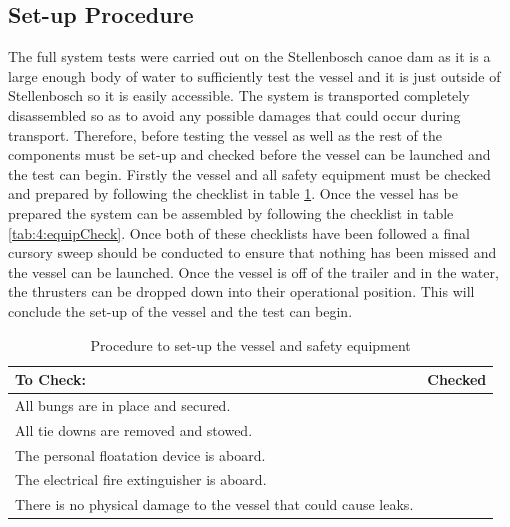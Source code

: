 \subsection{Set-up Procedure} 
The full system tests were carried out on the Stellenbosch canoe dam as it is a large enough body of water to sufficiently test the vessel and it is just outside of Stellenbosch so it is easily accessible. The system is transported completely disassembled so as to avoid any possible damages that could occur during transport. Therefore, before testing the vessel as well as the rest of the components must be set-up and checked before the vessel can be launched and the test can begin. Firstly the vessel and all safety equipment must be checked and prepared by following the checklist in table \ref{tab:4:boatCheck}. Once the vessel has be prepared the system can be assembled by following the checklist in table \ref{tab:4:equipCheck}. Once both of these checklists have been followed a final cursory sweep should be conducted to ensure that nothing has been missed and the vessel can be launched. Once the vessel is off of the trailer and in the water, the thrusters can be dropped down into their operational position. This will conclude the set-up of the vessel and the test can begin. 
\begin{table}
	\begin{center}
		
		\caption{Procedure to set-up the vessel and safety equipment}
		\label{tab:4:boatCheck}
		\begin{tabular}{|l|l|}
			\hline
			To Check: & Checked \\
			\hline
			All bungs are in place and secured. &\\
			\hline
			All tie downs are removed and stowed. &\\
			\hline
			The personal floatation device is aboard. &\\
			\hline
			The electrical fire extinguisher is aboard. &\\
			\hline
			There is no physical damage to the vessel that could cause leaks.&\\
			\hline
		\end{tabular}
	\end{center}
\end{table}
